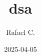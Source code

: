 \documentclass[10pt,
 article,
 amsmath,amssymb
]{revtex4-2}
\begin{document}
\title{dsa}



\author{Rafael C.}




\date{2025-04-05}







\maketitle

\tableofcontents
\end{document}
